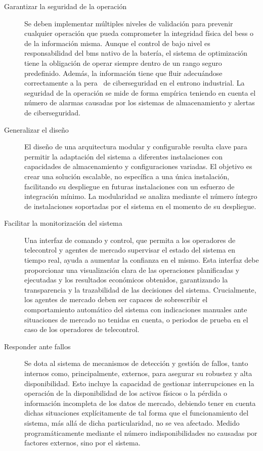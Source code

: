 \begin{description}
  \item[Garantizar la seguridad de la operación] Se deben implementar múltiples niveles de validación para prevenir cualquier operación que pueda comprometer la integridad física del \gls{bess} o de la información misma. Aunque el control de bajo nivel es responsabilidad del \gls{bms} nativo de la batería, el sistema de optimización tiene la obligación de operar siempre dentro de un rango seguro predefinido. Además, la información tiene que fluir adecuándose correctamente a la \gls{pera}~\cite{williams1994purdue} de ciberseguridad en el entrono industrial. La seguridad de la operación se mide de forma empírica teniendo en cuenta el número de alarmas causadas por los sistemas de almacenamiento y alertas de ciberseguridad.

  \item[Generalizar el diseño] El diseño de una arquitectura modular y configurable resulta clave para permitir la adaptación del sistema a diferentes instalaciones con capacidades de almacenamiento y configuraciones variadas. El objetivo es crear una solución escalable, no específica a una única instalación, facilitando su despliegue en futuras instalaciones con un esfuerzo de integración mínimo. La modularidad se analiza mediante el número íntegro de instalaciones soportadas por el sistema en el momento de su despliegue.

  \item[Facilitar la monitorización del sistema] Una interfaz de comando y control, que permita a los operadores de telecontrol y agentes de mercado supervisar el estado del sistema en tiempo real, ayuda a aumentar la confianza en el mismo. Esta interfaz debe proporcionar una visualización clara de las operaciones planificadas y ejecutadas y los resultados económicos obtenidos, garantizando la transparencia y la trazabilidad de las decisiones del sistema. Crucialmente, los agentes de mercado deben ser capaces de sobrescribir el comportamiento automático del sistema con indicaciones manuales ante situaciones de mercado no tenidas en cuenta, o periodos de prueba en el caso de los operadores de telecontrol.

  \item[Responder ante fallos] Se dota al sistema de mecanismos de detección y gestión de fallos, tanto internos como, principalmente, externos, para asegurar su robustez y alta disponibilidad. Esto incluye la capacidad de gestionar interrupciones en la operación de la disponibilidad de los activos físicos o la pérdida o información incompleta de los datos de mercado, debiendo tener en cuenta dichas situaciones explícitamente de tal forma que el funcionamiento del sistema, más allá de dicha particularidad, no se vea afectado. Medido programáticamente mediante el número indisponibilidades no causadas por factores externos, sino por el sistema.


\end{description}

